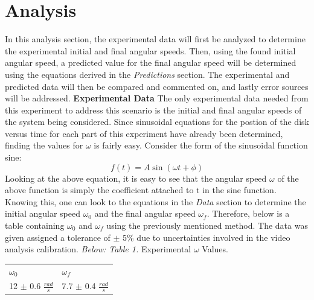 \documentclass[12pt,letterpaper]{article}
\begin{document}
\section{Analysis}
In this analysis section, the experimental data will first be analyzed to determine the experimental initial and final angular speeds. Then, using the found initial angular speed, a predicted value for the final angular speed will be determined using the equations derived in the \textit{Predictions} section. The experimental and predicted data will then be compared and commented on, and lastly error sources will be addressed.
\newline\newline
\textbf{Experimental Data}
\newline
The only experimental data needed from this experiment to address this scenario is the initial and final angular speeds of the system being considered. Since sinusoidal equations for the postion of the disk versus time for each part of this experiment have already been determined, finding the values for \(\omega\) is fairly easy. Consider the form of the sinusoidal function sine:
\begin{equation}
f(t) = A\sin({\omega}t + \phi)
\end{equation}
Looking at the above equation, it is easy to see that the angular speed \(\omega\) of the above function is simply the coefficient attached to t in the sine function. Knowing this, one can look to the equations in the \textit{Data} section to determine the initial angular speed \(\omega_0\) and the final angular speed \(\omega_f\). Therefore, below is a table containing \(\omega_0\) and \(\omega_f\) using the previously mentioned method. The data was given assigned a tolerance of \(\pm\) 5\% due to uncertainties involved in the video analysis calibration.
\newline\newline
\textit{Below: Table 1.} Experimental \(\omega\) Values.
{\renewcommand{\arraystretch}{1.2}
\begin{table}[h]
\hspace{2.05in}
\begin{tabular}{ll}
\hspace{.32in}\(\omega_0\) \hspace{.5in}& \hspace{.85in} \(\omega_f\)\\
12 \(\pm\) 0.6 \(\frac{rad}{s}\)\hspace{.25in}&\hspace{.5in} 7.7 \(\pm\) 0.4 \(\frac{rad}{s}\)\\             
\end{tabular}
\end{table}
\newline
}
\end{document}
